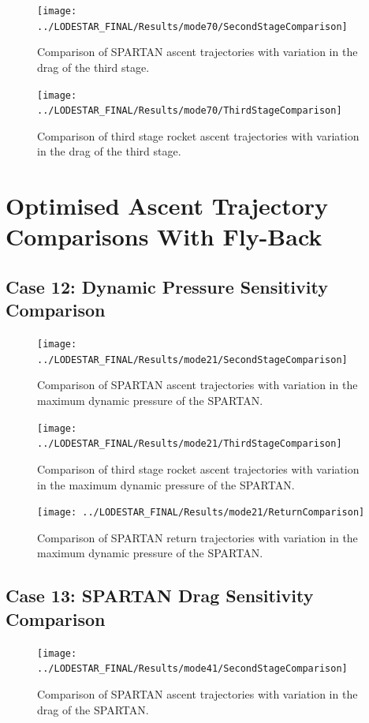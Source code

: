 \begin{figure}[!th]
\centering
\texttt{[image: ../LODESTAR\_FINAL/Results/mode70/SecondStageComparison]}
\caption{Comparison of SPARTAN ascent trajectories with variation in the drag of the third stage.}
\label{fig:SecondStageComparison8}
\end{figure}


\begin{figure}[!th]
\centering
\texttt{[image: ../LODESTAR\_FINAL/Results/mode70/ThirdStageComparison]}
\caption{Comparison of third stage rocket ascent trajectories with variation in the drag of the third stage.}
\label{fig:ThirdStageComparison8}
\end{figure}

\FloatBarrier
\clearpage
\section{Optimised Ascent Trajectory Comparisons With Fly-Back}
\FloatBarrier
\subsection{Case 12: Dynamic Pressure Sensitivity Comparison}\label{sec:app_comparison21}
\begin{figure}[!th]
\centering
\texttt{[image: ../LODESTAR\_FINAL/Results/mode21/SecondStageComparison]}
\caption{Comparison of SPARTAN ascent trajectories with variation in the maximum dynamic pressure of the SPARTAN.}
\label{fig:SecondStageComparison9}
\end{figure}

\begin{figure}[!th]
\centering
\texttt{[image: ../LODESTAR\_FINAL/Results/mode21/ThirdStageComparison]}
\caption{Comparison of third stage rocket ascent trajectories with variation in the maximum dynamic pressure of the SPARTAN.}
\label{fig:ThirdStageComparison9}
\end{figure}

\begin{figure}[!th]
\centering
\texttt{[image: ../LODESTAR\_FINAL/Results/mode21/ReturnComparison]}
\caption{Comparison of SPARTAN return trajectories with variation in the maximum dynamic pressure of the SPARTAN.}
\label{fig:ReturnComparison}
\end{figure}



\FloatBarrier
\clearpage
\subsection{Case 13: SPARTAN Drag Sensitivity Comparison}\label{sec:app_comparison41}
\begin{figure}[!th]
\centering
\texttt{[image: ../LODESTAR\_FINAL/Results/mode41/SecondStageComparison]}
\caption{Comparison of SPARTAN ascent trajectories with variation in the drag of the SPARTAN.}
\label{fig:SecondStageComparison11}
\end{figure}

